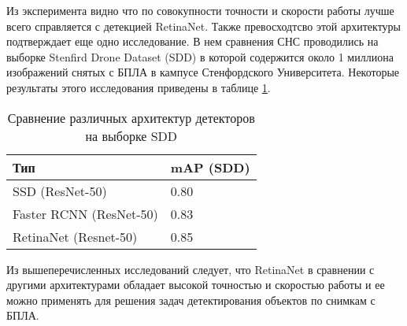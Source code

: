 Из эксперимента видно что по совокупности точности и скорости работы лучше всего справляется с детекцией RetinaNet. Также превосходтсво этой архитектуры подтверждает еще одно исследование. В нем сравнения СНС проводились на выборке Stenfird Drone Dataset (SDD) в которой содержится около 1 миллиона изображений снятых с БПЛА в кампусе Стенфордского Университета. Некоторые результаты этого исследования приведены в таблице \ref{leaderboard-table-sdd}.

\begin{table}[H]
  \caption{Сравнение различных архитектур детекторов на выборке SDD}\label{leaderboard-table-sdd}
  \begin{tabular}{|p{7cm}|p{5cm}|}
    \hline
    {Тип} & {mAP (SDD)} \\
    \hline
    SSD (ResNet-50) & 0.80 \\
    \hline
    Faster RCNN (ResNet-50) & 0.83 \\
    \hline
    RetinaNet (Resnet-50) & 0.85 \\
    \hline
  \end{tabular}
\end{table}

Из вышеперечисленных исследований следует, что RetinaNet в сравнении с другими архитектурами обладает высокой точностью и скоростью работы и ее можно применять для решения задач детектирования объектов по снимкам с БПЛА.
